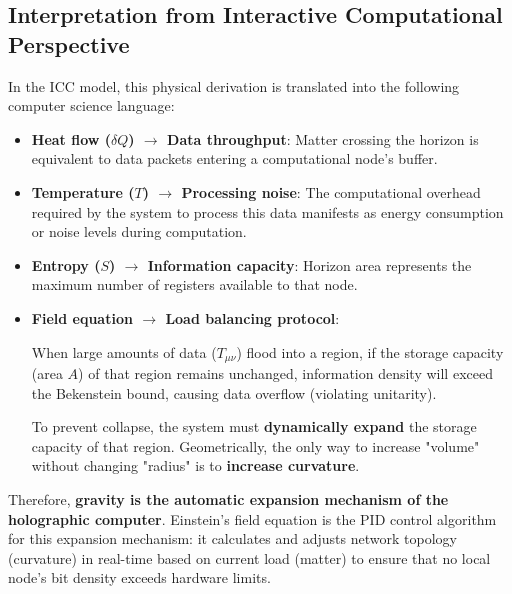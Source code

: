 \subsection{Interpretation from Interactive Computational Perspective}

In the ICC model, this physical derivation is translated into the following computer science language:

\begin{itemize}
\item \textbf{Heat flow ($\delta Q$) $\rightarrow$ Data throughput}: Matter crossing the horizon is equivalent to data packets entering a computational node's buffer.

\item \textbf{Temperature ($T$) $\rightarrow$ Processing noise}: The computational overhead required by the system to process this data manifests as energy consumption or noise levels during computation.

\item \textbf{Entropy ($S$) $\rightarrow$ Information capacity}: Horizon area represents the maximum number of registers available to that node.

\item \textbf{Field equation $\rightarrow$ Load balancing protocol}:

    When large amounts of data ($T_{\mu\nu}$) flood into a region, if the storage capacity (area $A$) of that region remains unchanged, information density will exceed the Bekenstein bound, causing data overflow (violating unitarity).

    To prevent collapse, the system must \textbf{dynamically expand} the storage capacity of that region. Geometrically, the only way to increase "volume" without changing "radius" is to \textbf{increase curvature}.
\end{itemize}

Therefore, \textbf{gravity is the automatic expansion mechanism of the holographic computer}. Einstein's field equation is the PID control algorithm for this expansion mechanism: it calculates and adjusts network topology (curvature) in real-time based on current load (matter) to ensure that no local node's bit density exceeds hardware limits.
